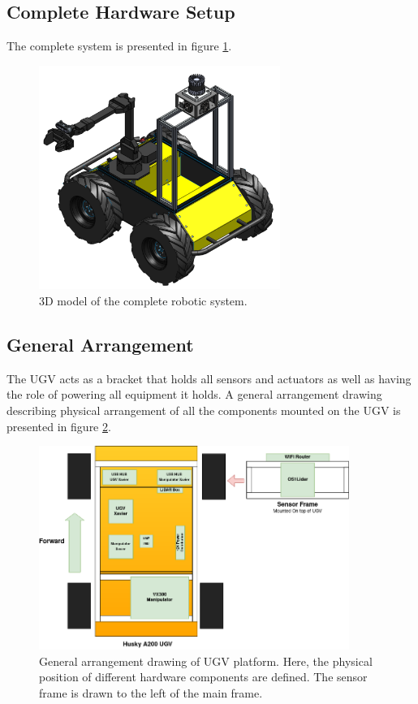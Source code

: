 \subsection{Complete Hardware Setup}

The complete system is presented in figure \ref{fig:hardware}.

\begin{figure}[H]
  \centering
  \includegraphics[width = 0.7\textwidth]{Figures/husky_completed.pdf}
  \caption{3D model of the complete robotic system.}
  \label{fig:hardware}
\end{figure}

\subsection{General Arrangement}\label{M:H:GeneralArrangement}
The UGV acts as a bracket that holds all sensors and actuators as well as having the role of powering all equipment it holds. A general arrangement drawing describing physical arrangement of all the components mounted on the UGV is presented in figure \ref{fig:general_arrangement}.

\begin{figure}[H]
  \centering
   \includegraphics[width = 0.9\textwidth]{Figures/general_arrangement.drawio.png}
  \caption{General arrangement drawing of UGV platform. Here, the physical position of different hardware components are defined. The sensor frame is drawn to the left of the main frame.}
  \label{fig:general_arrangement}
\end{figure}

